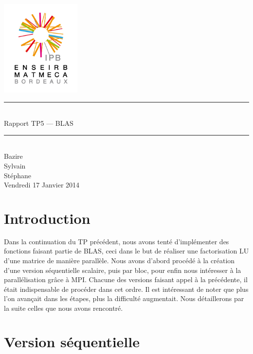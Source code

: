 \documentclass[a4paper,11pt]{article}
\begin{document}
\begin{titlepage}
  \begin{center}

    \begin{center}
      \includegraphics[width=4cm]{EM.jpg}
    \end{center}

    \vspace*{1cm}
        
    \rule{0.75\linewidth}{0.7mm}\\[0.4cm]
    {\Huge Rapport TP5 --- BLAS\\[0.4cm]}
    \rule{0.75\linewidth}{0.7mm} \\[1.5cm]

    {\Large Bazire \\Sylvain {}\\Stéphane \\[2cm]}
    {\Large Vendredi 17 Janvier 2014}
  \end{center}
\end{titlepage}

\tableofcontents
\clearpage
\section{Introduction}

Dans la continuation du TP précédent, nous avons tenté d'implémenter des fonctions faisant partie de BLAS, ceci dans le but de réaliser une factorisation LU d'une matrice de manière parallèle. Nous avons d'abord procédé à la création d'une version séquentielle scalaire, puis par bloc, pour enfin nous intéresser à la parallélisation grâce à MPI. Chacune des versions faisant appel à la précédente, il était indispensable de procéder dans cet ordre. Il est intéressant de noter que plus l'on avançait dans les étapes, plus la difficulté augmentait. Nous détaillerons par la suite celles que nous avons rencontré.

\section{Version séquentielle}
\end{document}
